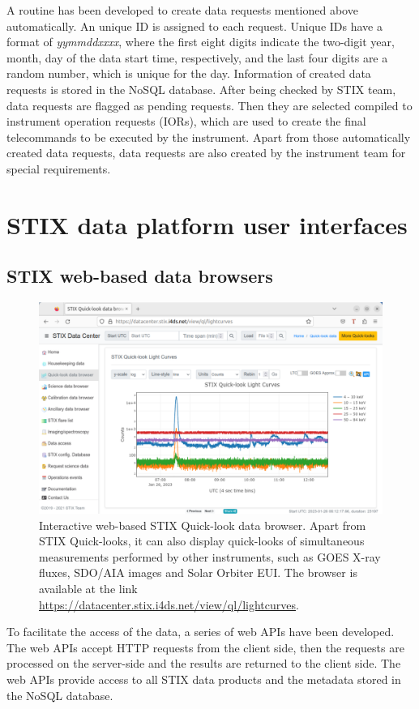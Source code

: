 \documentclass{aa}
\begin{document}
A routine has been developed to create data requests mentioned above automatically. 
An unique ID is assigned to each request.
Unique IDs have a format of {\em yymmddxxxx}, where 
the first eight digits indicate the two-digit year,  month, day of the data start time, respectively, 
and the last four digits are a random number, which is unique for the day.  
Information of created data requests is stored in the NoSQL database. 
After being checked by STIX team, data requests  are flagged as pending requests.
Then they are selected compiled to instrument operation requests (IORs), which are used to create the final telecommands
to be executed by the instrument.
Apart from those automatically created data requests, 
data requests are also created by the instrument team for special requirements.
\section{STIX data platform user interfaces}

\subsection{STIX web-based data browsers}
\begin{figure}[h]
  \centering
  \includegraphics[width=0.7\linewidth]{figures/data-browser.pdf}
  \caption{ 
    Interactive web-based STIX Quick-look data browser. 
    Apart from STIX Quick-looks, it can also display quick-looks of simultaneous measurements 
    performed by other instruments, such as GOES X-ray fluxes, SDO/AIA images and Solar Orbiter EUI. 
    The browser is available at the link \url{https://datacenter.stix.i4ds.net/view/ql/lightcurves}.}
  \label{fig:qlbrowser}
\end{figure}


To facilitate the access of the data, a series of web APIs have been developed.
The web APIs accept HTTP requests from the client side, 
then the requests are processed on the server-side
 and the results are returned to the client side.  
The web APIs provide access to all STIX data products 
and the metadata stored in the NoSQL database. 
\end{document}
